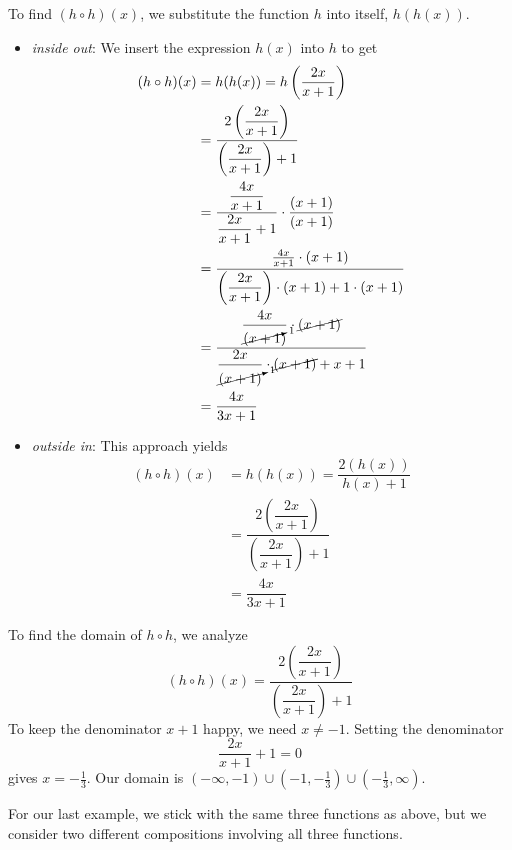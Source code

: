 {
To find $(h \circ h)(x)$, we substitute the function $h$ into itself, $h(h(x))$.

\begin{itemize}

\item  \textit{inside out}: We insert the expression $h(x)$ into $h$ to get
\begin{align*}
(h \circ h)(x) & = h(h(x)) =h\left(\dfrac{2x}{x+1}\right) \\ 
&=\dfrac{2\left(\dfrac{2x}{x+1}\right)}{\left(\dfrac{2x}{x+1}\right)+1}\\ 
 & = \dfrac{\dfrac{4x}{x+1}}{\dfrac{2x}{x+1}+1} \cdot \dfrac{(x+1)}{(x+1)}\\ 
 & = \dfrac{\frac{4x}{x+1} \cdot (x+1)}{\left(\dfrac{2x}{x+1}\right)\cdot(x+1)+1\cdot(x+1)}\\
& = \dfrac{\dfrac{4x}{\cancelto{1}{(x+1})} \cdot \cancel{(x+1)}}{\dfrac{2x}{\cancelto{1}{(x+1)}}\cdot\cancel{(x+1)}+x+1}\\ 
& = \dfrac{4x}{3x+1}
 \end{align*}

\item  \textit{outside in}: This approach yields
\begin{align*}
(h \circ h)(x) & = h(h(x)) = \dfrac{2 (h(x))}{h(x) + 1}\\ 
& = \dfrac{2\left(\dfrac{2x}{x+1}\right)}{\left(\dfrac{2x}{x+1}\right)+1}\\
& = \dfrac{4x}{3x+1} \tag*{same algebra as before}
 \end{align*}

\end{itemize}

To find the domain of $h \circ h$, we analyze \[(h \circ h)(x) = \dfrac{2\left(\dfrac{2x}{x+1}\right)}{\left(\dfrac{2x}{x+1}\right)+1}\]  To keep the denominator $x+1$ happy, we need $x \neq -1$.  Setting the denominator \[\frac{2x}{x+1}+1 = 0\] gives $x = -\frac{1}{3}$.  Our domain is $(-\infty, -1) \cup \left(-1, -\frac{1}{3}\right) \cup \left(-\frac{1}{3}, \infty\right)$. 
}

\medskip

For our last example, we stick with the same three functions as above, but we consider two different compositions involving all three functions.

\medskip

